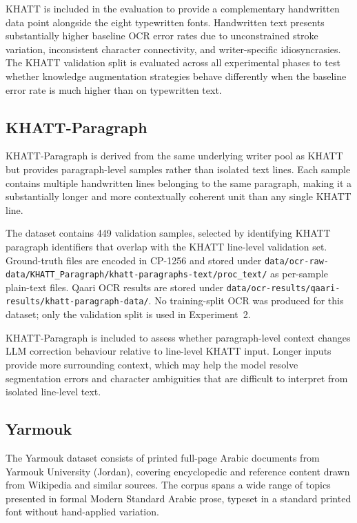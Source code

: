 KHATT is included in the evaluation to provide a complementary handwritten
data point alongside the eight typewritten fonts. Handwritten text presents
substantially higher baseline OCR error rates due to unconstrained stroke
variation, inconsistent character connectivity, and writer-specific
idiosyncrasies. The KHATT validation split is evaluated across all
experimental phases to test whether knowledge augmentation strategies behave
differently when the baseline error rate is much higher than on typewritten
text.

\subsection{KHATT-Paragraph}
\label{subsec:khatt_paragraph}

KHATT-Paragraph is derived from the same underlying writer pool as KHATT
but provides paragraph-level samples rather than isolated text lines.
Each sample contains multiple handwritten lines belonging to the same
paragraph, making it a substantially longer and more contextually coherent
unit than any single KHATT line.

The dataset contains 449 validation samples, selected by identifying
KHATT paragraph identifiers that overlap with the KHATT line-level
validation set.
Ground-truth files are encoded in CP-1256 and stored under
\texttt{data/ocr-raw-data/KHATT\_Paragraph/khatt-paragraphs-text/proc\_text/}
as per-sample plain-text files.
Qaari OCR results are stored under
\texttt{data/ocr-results/qaari-results/khatt-paragraph-data/}.
No training-split OCR was produced for this dataset; only the validation
split is used in Experiment~2.

KHATT-Paragraph is included to assess whether paragraph-level context
changes LLM correction behaviour relative to line-level KHATT input.
Longer inputs provide more surrounding context, which may help the model
resolve segmentation errors and character ambiguities that are difficult
to interpret from isolated line-level text.

\subsection{Yarmouk}
\label{subsec:yarmouk}

The Yarmouk dataset consists of printed full-page Arabic documents from
Yarmouk University (Jordan), covering encyclopedic and reference content
drawn from Wikipedia and similar sources.
The corpus spans a wide range of topics presented in formal Modern Standard
Arabic prose, typeset in a standard printed font without hand-applied
variation.

